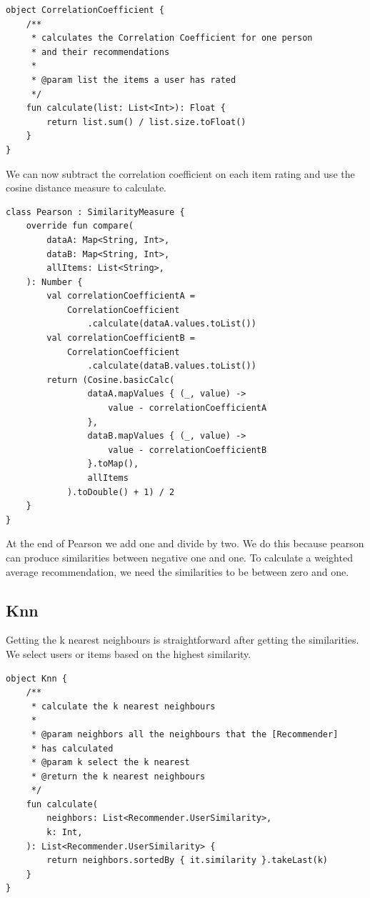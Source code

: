 \begin{verbatim}
object CorrelationCoefficient {
    /**
     * calculates the Correlation Coefficient for one person
     * and their recommendations
     *
     * @param list the items a user has rated
     */
    fun calculate(list: List<Int>): Float {
        return list.sum() / list.size.toFloat()
    }
}
\end{verbatim}

We can now subtract the correlation coefficient on each item rating and use the cosine distance measure to calculate.

\begin{verbatim}
class Pearson : SimilarityMeasure {
    override fun compare(
        dataA: Map<String, Int>,
        dataB: Map<String, Int>,
        allItems: List<String>,
    ): Number {
        val correlationCoefficientA =
            CorrelationCoefficient
                .calculate(dataA.values.toList())
        val correlationCoefficientB =
            CorrelationCoefficient
                .calculate(dataB.values.toList())
        return (Cosine.basicCalc(
                dataA.mapValues { (_, value) ->
                    value - correlationCoefficientA
                },
                dataB.mapValues { (_, value) ->
                    value - correlationCoefficientB
                }.toMap(),
                allItems
            ).toDouble() + 1) / 2
    }
}
\end{verbatim}

At the end of Pearson we add one and divide by two. We do this because pearson can produce similarities between negative one and one. To calculate a weighted average recommendation, we need the similarities to be between zero and one.

\subsection{Knn}

Getting the k nearest neighbours is straightforward after getting the similarities. We select users or items based on the highest similarity.

\begin{verbatim}
object Knn {
    /**
     * calculate the k nearest neighbours
     *
     * @param neighbors all the neighbours that the [Recommender] 
     * has calculated
     * @param k select the k nearest
     * @return the k nearest neighbours
     */
    fun calculate(
        neighbors: List<Recommender.UserSimilarity>,
        k: Int,
    ): List<Recommender.UserSimilarity> {
        return neighbors.sortedBy { it.similarity }.takeLast(k)
    }
}
\end{verbatim}

